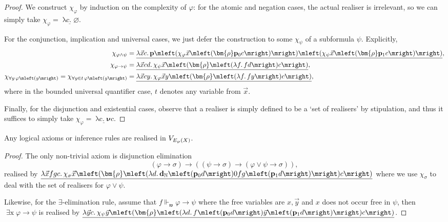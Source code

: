 \documentclass[12pt,openany]{book}
\theoremstyle{plain}
\theoremstyle{definition}
\newcommand\opA[1]{\mathop{\forall #1}}
\newcommand\opE[1]{\mathop{\exists #1}}
\newcommand\oplam[1]{\mathop{\lambda #1.}}
\newcommand\bp{\mathbf{p}}
\newcommand\bdN{\mathbf{d}_\mathbb{N}}
\begin{document}
\begin{proof}
  We construct $\chi_\varphi$ by induction on the complexity of $\varphi$: for the atomic and negation cases, the actual realiser is irrelevant, so we can simply take $\chi_\varphi = \underline{\oplam{\vec{x} c} \varnothing}$.

  For the conjunction, implication and universal cases, we just defer the construction to some $\chi_\psi$ of a subformula $\psi$. Explicitly,
  \begin{align*}
    \chi_{\varphi \land \psi}                                                             & = \underline{\oplam{\vec{x} c} \bp \mleft(\chi_\varphi \vec{x} \mleft(\bm{\rho} \bp_0 c\mright)\mright) \mleft(\chi_\psi \vec{x} \mleft(\bm{\rho} \bp_1 c\mright)\mright)}, \\
    \chi_{\varphi \rightarrow \psi}                                                       & = \underline{\oplam{\vec{x} cd} \chi_\psi \vec{x} \mleft(\bm{\rho} \mleft(\oplam{f} fd\mright) c\mright)},                                                                  \\
    \chi_{\opA{y} \varphi\mleft(y\mright)} = \chi_{\opA{y \in t} \varphi\mleft(y\mright)} & = \underline{\oplam{\vec{x} cy} \chi_\varphi \vec{x} y \mleft(\bm{\rho} \mleft(\oplam{f} fy\mright) c\mright)},
  \end{align*}
  where in the bounded universal quantifier case, $t$ denotes any variable from $\vec{x}$.

  Finally, for the disjunction and existential cases, observe that a realiser is simply defined to be a `set of realisers' by stipulation, and thus it suffices to simply take $\chi_\varphi = \underline{\oplam{\vec{x} c} \bm{\nu} c}$.
\end{proof}

\begin{corollary}
  Any logical axioms or inference rules are realised in $V_{E_\wp\mleft(X\mright)}$.
\end{corollary}

\begin{proof}
  The only non-trivial axiom is disjunction elimination
  \[\left(\varphi \rightarrow \sigma\right) \rightarrow \left(\left(\psi \rightarrow \sigma\right) \rightarrow \left(\varphi \lor \psi \rightarrow \sigma\right)\right),\]
  realised by $\underline{\oplam{\vec{x} fgc} \chi_\sigma \vec{x} \mleft(\bm{\rho} \mleft(\oplam{d} \bdN \mleft(\bp_0 d\mright) 0 fg \mleft(\bp_1 d\mright)\mright) c\mright)}$ where we use $\chi_\sigma$ to deal with the set of realisers for $\varphi \lor \psi$.

  Likewise, for the $\exists$-elimination rule, assume that $f \Vdash_\mathfrak{w} \varphi \rightarrow \psi$ where the free variables are $x, \vec{y}$ and $x$ does not occur free in $\psi$, then $\opE{x} \varphi \rightarrow \psi$ is realised by $\underline{\oplam{\vec{y} c} \chi_\psi \vec{y} \mleft(\bm{\rho} \mleft(\oplam{d} f \mleft(\bp_0 d\mright) \vec{y} \mleft(\bp_1 d\mright)\mright) c\mright)}$.
\end{proof}
\end{document}
